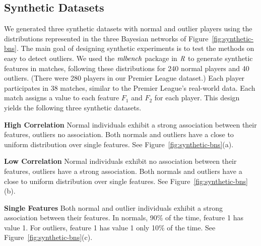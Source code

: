 {								
				
				

	\subsection{Synthetic Datasets}\label{sec:visual}
	We generated three synthetic datasets with normal and outlier players using the distributions represented in the three Bayesian networks of Figure~\ref{fig:synthetic-bns}. The main goal of designing synthetic experiments is to test the methods on  easy to detect outliers. 
	 We used the $\it{mlbench}$ package in $\it{R}$ to generate synthetic features in matches, following these distributions for 240 normal players and 40 outliers. (There were 280 players in our Premier League dataset.) Each player participates in 38 matches, similar to the Premier League's real-world data. Each match assigns a value to each feature $F_1$ and $F_{2}$ for each player. This design yields the following three synthetic datasets. 
	\begin{description}
		\item\textbf{High Correlation}  Normal individuals exhibit a strong association between their features, outliers no association. Both normals and outliers have a close to uniform distribution over single features. See Figure~\ref{fig:synthetic-bns}(a).
		\item\textbf{Low Correlation}  Normal individuals exhibit no association between their features, outliers have a strong association. Both normals and outliers have a close to uniform distribution over single features. See Figure~\ref{fig:synthetic-bns}(b).
		\item\textbf{Single Features} Both normal and outlier individuals exhibit a strong association between their features. In normals, 90\% of the time, feature 1 has value 1. For outliers, feature 1 has value 1 only 10\% of the time. See Figure~\ref{fig:synthetic-bns}(c).
	\end{description}
	
}
